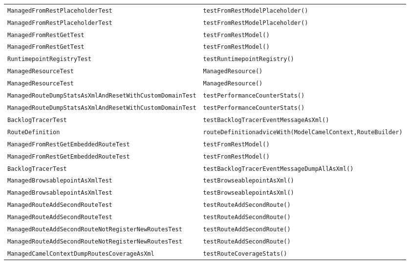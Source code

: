 \begin{center}
\begin{longtable}{ll}
\lstinline/ManagedFromRestPlaceholderTest/&{\lstinline/testFromRestModelPlaceholder()/}\\
\lstinline/ManagedFromRestPlaceholderTest/&{\lstinline/testFromRestModelPlaceholder()/}\\
\lstinline/ManagedFromRestGetTest/&{\lstinline/testFromRestModel()/}\\
\lstinline/ManagedFromRestGetTest/&{\lstinline/testFromRestModel()/}\\
\lstinline/RuntimepointRegistryTest/&{\lstinline/testRuntimepointRegistry()/}\\
\lstinline/ManagedResourceTest/&{\lstinline/ManagedResource()/}\\
\lstinline/ManagedResourceTest/&{\lstinline/ManagedResource()/}\\
\lstinline/ManagedRouteDumpStatsAsXmlAndResetWithCustomDomainTest/&{\lstinline/testPerformanceCounterStats()/}\\
\lstinline/ManagedRouteDumpStatsAsXmlAndResetWithCustomDomainTest/&{\lstinline/testPerformanceCounterStats()/}\\
\lstinline/BacklogTracerTest/&{\lstinline/testBacklogTracerEventMessageAsXml()/}\\
\lstinline/RouteDefinition/&{\lstinline/routeDefinitionadviceWith(ModelCamelContext,RouteBuilder)/}\\
\lstinline/ManagedFromRestGetEmbeddedRouteTest/&{\lstinline/testFromRestModel()/}\\
\lstinline/ManagedFromRestGetEmbeddedRouteTest/&{\lstinline/testFromRestModel()/}\\
\lstinline/BacklogTracerTest/&{\lstinline/testBacklogTracerEventMessageDumpAllAsXml()/}\\
\lstinline/ManagedBrowsablepointAsXmlTest/&{\lstinline/testBrowseablepointAsXml()/}\\
\lstinline/ManagedBrowsablepointAsXmlTest/&{\lstinline/testBrowseablepointAsXml()/}\\
\lstinline/ManagedRouteAddSecondRouteTest/&{\lstinline/testRouteAddSecondRoute()/}\\
\lstinline/ManagedRouteAddSecondRouteTest/&{\lstinline/testRouteAddSecondRoute()/}\\
\lstinline/ManagedRouteAddSecondRouteNotRegisterNewRoutesTest/&{\lstinline/testRouteAddSecondRoute()/}\\
\lstinline/ManagedRouteAddSecondRouteNotRegisterNewRoutesTest/&{\lstinline/testRouteAddSecondRoute()/}\\
\lstinline/ManagedCamelContextDumpRoutesCoverageAsXml/&{\lstinline/testRouteCoverageStats()/}\\

\end{longtable}
\end{center}
